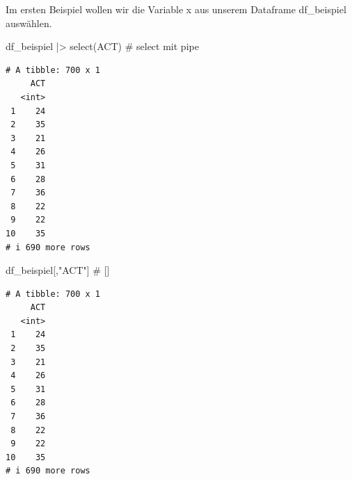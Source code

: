 \documentclass[
  letterpaper,
  DIV=11,
  numbers=noendperiod]{scrreprt}
\newenvironment{Shaded}{\begin{snugshade}}{\end{snugshade}}
\newcommand{\CommentTok}[1]{\textcolor[rgb]{0.37,0.37,0.37}{#1}}
\newcommand{\FunctionTok}[1]{\textcolor[rgb]{0.28,0.35,0.67}{#1}}
\newcommand{\NormalTok}[1]{\textcolor[rgb]{0.00,0.23,0.31}{#1}}
\newcommand{\SpecialCharTok}[1]{\textcolor[rgb]{0.37,0.37,0.37}{#1}}
\newcommand{\StringTok}[1]{\textcolor[rgb]{0.13,0.47,0.30}{#1}}
\begin{document}
Im ersten Beispiel wollen wir die Variable x aus unserem Dataframe
df\_beispiel auswählen.

\begin{Shaded}
\begin{Highlighting}[]
\NormalTok{df\_beispiel }\SpecialCharTok{|\textgreater{}} \FunctionTok{select}\NormalTok{(ACT) }\CommentTok{\# select mit pipe}
\end{Highlighting}
\end{Shaded}

\begin{verbatim}
# A tibble: 700 x 1
     ACT
   <int>
 1    24
 2    35
 3    21
 4    26
 5    31
 6    28
 7    36
 8    22
 9    22
10    35
# i 690 more rows
\end{verbatim}

\begin{Shaded}
\begin{Highlighting}[]
\NormalTok{df\_beispiel[,}\StringTok{"ACT"}\NormalTok{] }\CommentTok{\# []}
\end{Highlighting}
\end{Shaded}

\begin{verbatim}
# A tibble: 700 x 1
     ACT
   <int>
 1    24
 2    35
 3    21
 4    26
 5    31
 6    28
 7    36
 8    22
 9    22
10    35
# i 690 more rows
\end{verbatim}

\begin{Shaded}
\end{Shaded}
\end{document}

